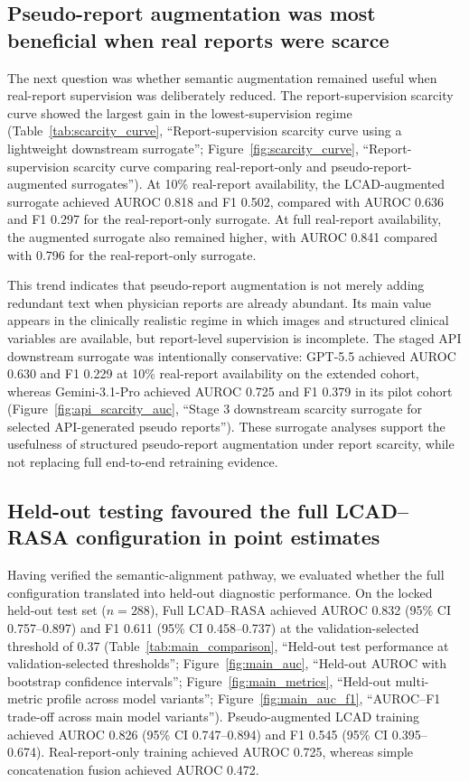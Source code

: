 \subsection{Pseudo-report augmentation was most beneficial when real reports were scarce}
\label{subsec:scarcity_results}

The next question was whether semantic augmentation remained useful when real-report supervision was deliberately reduced. The report-supervision scarcity curve showed the largest gain in the lowest-supervision regime (Table~\ref{tab:scarcity_curve}, ``Report-supervision scarcity curve using a lightweight downstream surrogate''; Figure~\ref{fig:scarcity_curve}, ``Report-supervision scarcity curve comparing real-report-only and pseudo-report-augmented surrogates''). At 10\% real-report availability, the LCAD-augmented surrogate achieved AUROC 0.818 and F1 0.502, compared with AUROC 0.636 and F1 0.297 for the real-report-only surrogate. At full real-report availability, the augmented surrogate also remained higher, with AUROC 0.841 compared with 0.796 for the real-report-only surrogate.

This trend indicates that pseudo-report augmentation is not merely adding redundant text when physician reports are already abundant. Its main value appears in the clinically realistic regime in which images and structured clinical variables are available, but report-level supervision is incomplete. The staged API downstream surrogate was intentionally conservative: GPT-5.5 achieved AUROC 0.630 and F1 0.229 at 10\% real-report availability on the extended cohort, whereas Gemini-3.1-Pro achieved AUROC 0.725 and F1 0.379 in its pilot cohort (Figure~\ref{fig:api_scarcity_auc}, ``Stage 3 downstream scarcity surrogate for selected API-generated pseudo reports''). These surrogate analyses support the usefulness of structured pseudo-report augmentation under report scarcity, while not replacing full end-to-end retraining evidence.

\subsection{Held-out testing favoured the full LCAD--RASA configuration in point estimates}
\label{subsec:diagnostic_results}

Having verified the semantic-alignment pathway, we evaluated whether the full configuration translated into held-out diagnostic performance. On the locked held-out test set ($n=288$), Full LCAD--RASA achieved AUROC 0.832 (95\% CI 0.757--0.897) and F1 0.611 (95\% CI 0.458--0.737) at the validation-selected threshold of 0.37 (Table~\ref{tab:main_comparison}, ``Held-out test performance at validation-selected thresholds''; Figure~\ref{fig:main_auc}, ``Held-out AUROC with bootstrap confidence intervals''; Figure~\ref{fig:main_metrics}, ``Held-out multi-metric profile across model variants''; Figure~\ref{fig:main_auc_f1}, ``AUROC--F1 trade-off across main model variants''). Pseudo-augmented LCAD training achieved AUROC 0.826 (95\% CI 0.747--0.894) and F1 0.545 (95\% CI 0.395--0.674). Real-report-only training achieved AUROC 0.725, whereas simple concatenation fusion achieved AUROC 0.472.

